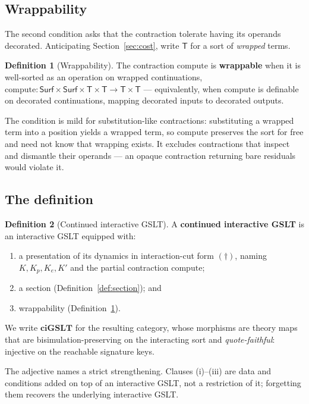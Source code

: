 \documentclass[11pt]{article}
\theoremstyle{definition}
\newtheorem{definition}{Definition}[section]
\theoremstyle{plain}
\theoremstyle{remark}
\newcommand{\ciGSLT}{\mathbf{ciGSLT}}
\newcommand{\Surf}{\mathsf{Surf}}
\newcommand{\Tw}{\mathsf{T}}
\newcommand{\compute}{\mathrm{compute}}
\begin{document}
\subsection{Wrappability}

The second condition asks that the contraction tolerate having its operands decorated.
Anticipating Section~\ref{sec:cost}, write $\Tw$ for a sort of \emph{wrapped} terms.

\begin{definition}[Wrappability]
\label{def:wrappable}
The contraction $\compute$ is \textbf{wrappable} when it is well-sorted as an operation
on wrapped continuations,
$\compute : \Surf \times \Surf \times \Tw \times \Tw \to \Tw \times \Tw$ ---
equivalently, when $\compute$ is definable on decorated continuations, mapping decorated
inputs to decorated outputs.
\end{definition}

The condition is mild for substitution-like contractions: substituting a wrapped term
into a position yields a wrapped term, so $\compute$ preserves the sort for free and
need not know that wrapping exists. It excludes contractions that inspect and dismantle
their operands --- an opaque contraction returning bare residuals would violate it.

\subsection{The definition}

\begin{definition}[Continued interactive GSLT]
\label{def:cigslt}
A \textbf{continued interactive GSLT} is an interactive GSLT equipped with:
\begin{enumerate}[label=(\roman*),leftmargin=2.5em]
  \item a presentation of its dynamics in interaction-cut form $(\dagger)$, naming
    $K, K_p, K_e, K'$ and the partial contraction $\compute$;
  \item a section (Definition~\ref{def:section}); and
  \item wrappability (Definition~\ref{def:wrappable}).
\end{enumerate}
We write $\ciGSLT$ for the resulting category, whose morphisms are theory maps that are
bisimulation-preserving on the interacting sort and \emph{quote-faithful}: injective on
the reachable signature keys.
\end{definition}

The adjective names a strict strengthening. Clauses (i)--(iii) are data and conditions
added on top of an interactive GSLT, not a restriction of it; forgetting them recovers
the underlying interactive GSLT.
\end{document}
